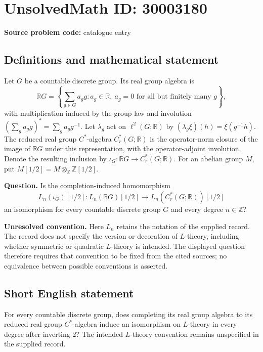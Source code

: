 \documentclass[11pt]{article}
\newcommand{\Z}{\mathbb{Z}}
\newcommand{\R}{\mathbb{R}}
\begin{document}
\section*{UnsolvedMath ID: 30003180}
\textbf{Source problem code:} catalogue entry
\subsection{Definitions and mathematical statement}
Let \(G\) be a countable discrete group. Its real group algebra is
\[
\R G=\left\{\sum_{g\in G}a_g g : a_g\in\R,\ a_g=0\text{ for all but finitely many }g\right\},
\]
with multiplication induced by the group law and involution \((\sum_g a_g g)^*=\sum_g a_g g^{-1}\). Let \(\lambda_g\) act on \(\ell^2(G;\R)\) by \((\lambda_g\xi)(h)=\xi(g^{-1}h)\). The reduced real group \(C^*\)-algebra \(C_r^*(G;\R)\) is the operator-norm closure of the image of \(\R G\) under this representation, with the operator-adjoint involution. Denote the resulting inclusion by \(\iota_G:\R G\to C_r^*(G;\R)\). For an abelian group \(M\), put \(M[1/2]=M\otimes_{\Z}\Z[1/2]\).

\textbf{Question.} Is the completion-induced homomorphism
\[
L_n(\iota_G)[1/2]:L_n(\R G)[1/2]\longrightarrow L_n(C_r^*(G;\R))[1/2]
\]
an isomorphism for every countable discrete group \(G\) and every degree \(n\in\Z\)?

\textbf{Unresolved convention.} Here \(L_n\) retains the notation of the supplied record. The record does not specify the version or decoration of \(L\)-theory, including whether symmetric or quadratic \(L\)-theory is intended. The displayed question therefore requires that convention to be fixed from the cited sources; no equivalence between possible conventions is asserted.
\subsection{Short English statement}
For every countable discrete group, does completing its real group algebra to its reduced real group \(C^*\)-algebra induce an isomorphism on \(L\)-theory in every degree after inverting \(2\)? The intended \(L\)-theory convention remains unspecified in the supplied record.
\end{document}
